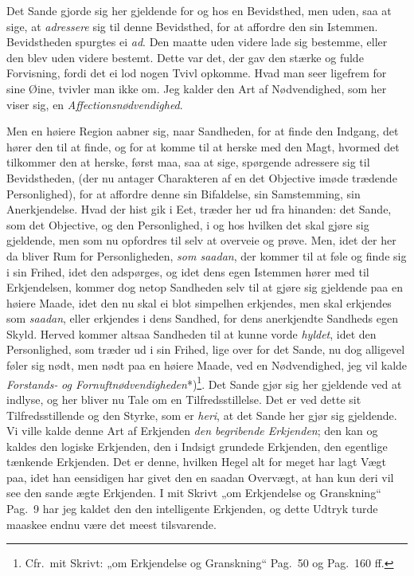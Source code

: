 \documentclass[12pt,a4paper]{book}
\newcommand{\apage}[1]{\marginnote{\footnotesize\textit{[#1]}}}
\begin{document}
Det Sande gjorde sig her gjeldende for og hos en Bevidsthed, men uden, saa
at sige, at \emph{adressere} sig til denne Bevidsthed, for at affordre den sin
Istemmen. Bevidstheden spurgtes ei \emph{ad}. Den maatte uden videre lade sig
bestemme, eller den blev uden videre bestemt. Dette var det, der gav den
stærke og fulde Forvisning, fordi det ei lod nogen Tvivl opkomme. Hvad man
seer ligefrem for sine Øine, tvivler man ikke om. Jeg kalder den Art af
Nødvendighed, som her viser sig, en \emph{Affectionsnødvendighed}.

Men en høiere Region aabner sig, naar Sandheden, for at finde den Indgang,
det hører den til at finde, og for at komme til at herske med den Magt,
hvormed det tilkommer den at herske, først maa, saa at sige, spørgende
adressere sig til Bevidstheden, (der nu antager Charakteren af en det
Objective imøde trædende Personlighed), for at affordre denne sin
Bifaldelse, sin Samstemming, sin Anerkjendelse. Hvad der hist gik i Eet,
træder her ud fra hinanden: det Sande, som det Objective, og den
Personlighed, i og hos hvilken det skal gjøre sig gjeldende, men som nu
opfordres til selv at overveie og prøve. Men, idet der her da bliver Rum
for Personligheden, \emph{som saadan}, der kommer til at føle og finde sig i sin
Frihed, idet den adspørges, og idet dens egen Istemmen hører med til
Erkjendelsen, kommer dog netop Sandheden selv til at gjøre sig gjeldende
paa en høiere Maade, idet den nu skal ei blot simpelhen erkjendes, men skal
erkjendes som \emph{saadan}, eller erkjendes i dens Sandhed, for dens anerkjendte
Sandheds egen Skyld. Herved kommer altsaa Sandheden til at kunne vorde
\emph{hyldet}, idet den Personlighed, som træder ud i sin Frihed, lige over for
det Sande, nu dog alligevel føler sig nødt, men nødt paa en høiere Maade,
ved en \apage{102} Nødvendighed, jeg vil kalde \emph{Forstands-} \emph{og
Fornuftnødvendigheden}*)\footnote{Cfr.\ mit Skrivt: „om Erkjendelse og
Granskning“ Pag.\ 50 og Pag.\ 160 ff.}. Det Sande gjør sig her gjeldende
ved at indlyse, og her bliver nu Tale om en Tilfredsstillelse. Det er ved
dette sit Tilfredsstillende og den Styrke, som er \emph{heri}, at det Sande her
gjør sig gjeldende. Vi ville kalde denne Art af Erkjenden \emph{den begribende
Erkjenden}; den kan og kaldes den logiske Erkjenden, den i Indsigt grundede
Erkjenden, den egentlige tænkende Erkjenden. Det er denne, hvilken Hegel
alt for meget har lagt Vægt paa, idet han eensidigen har givet den en
saadan Overvægt, at han kun deri vil see den sande ægte Erkjenden. I mit
Skrivt „om Erkjendelse og Granskning“ Pag.\ 9 har jeg kaldet den den
intelligente Erkjenden, og dette Udtryk turde maaskee endnu være det meest
tilsvarende.
\end{document}
